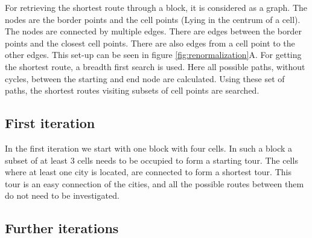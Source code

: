 For retrieving the shortest route through a block, it is considered as a graph. The nodes are the border points and the cell points (Lying in the centrum of a cell). The nodes are connected by multiple edges. There are edges between the border points and the closest cell points. There are also edges from a cell point to the other edges. This set-up can be seen in figure \ref{fig:renormalization}A. For getting the shortest route, a breadth first search is used. Here all possible paths, without cycles, between the starting and end node are calculated. Using these set of paths, the shortest routes visiting subsets of cell points are searched.

\subsection{First iteration}
In the first iteration we start with one block with four cells. In such a block a subset of at least 3 cells needs to be occupied to form a starting tour. The cells where at least one city is located, are connected to form a shortest tour. This tour is an easy connection of the cities, and all the possible routes between them do not need to be investigated.

\subsection{Further iterations}


